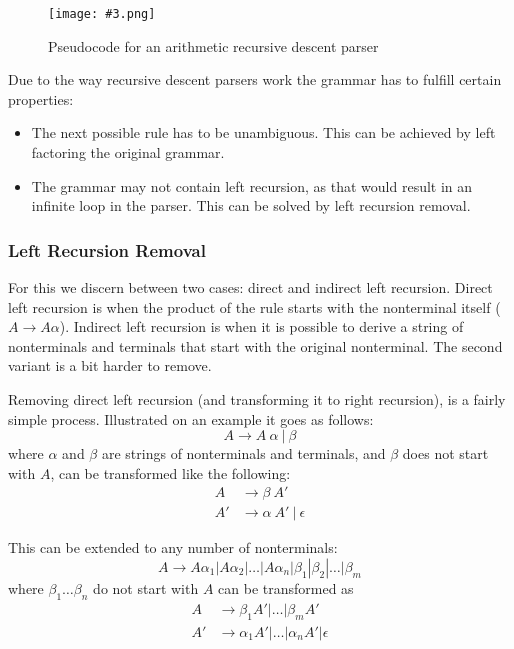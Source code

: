 \documentclass{article}
\newcommand{\fig}[4]{
	\begin{figure}[#1]
		\center
		\texttt{[image: \#3.png]}
		\caption{#4}
		\label{fig:#3}
	\end{figure}
	}
\begin{document}
\fig{h}{0.9}{rdparser}{Pseudocode for an arithmetic recursive descent parser}

Due to the way recursive descent parsers work the grammar has to fulfill certain properties:
\begin{itemize}
	\item The next possible rule has to be unambiguous.
		This can be achieved by left factoring the original grammar.
	\item The grammar may not contain left recursion, as that would result in an infinite loop in the parser.
		This can be solved by left recursion removal.
\end{itemize}

\subsubsection{Left Recursion Removal}
For this we discern between two cases: direct and indirect left recursion.
Direct left recursion is when the product of the rule starts with the nonterminal itself ($A \rightarrow A\alpha$).
Indirect left recursion is when it is possible to derive a string of nonterminals and terminals that start with the original nonterminal.
The second variant is a bit harder to remove.

Removing direct left recursion (and transforming it to right recursion), is a fairly simple process.
Illustrated on an example it goes as follows:
\begin{equation}
	A \rightarrow A\ \alpha\ |\ \beta
\end{equation}
where $\alpha$ and $\beta$ are strings of nonterminals and terminals, and $\beta$ does not start with $A$, can be transformed like the following:
\begin{align}
	A &\rightarrow \beta\ A'\\
	A' &\rightarrow \alpha\ A'\ |\ \epsilon
\end{align}

This can be extended to any number of nonterminals:
\begin{equation}
	A \rightarrow A\alpha_1 | A\alpha_2 | \dots | A\alpha_n | \beta_1 | \beta_2 | \dots | \beta_m
\end{equation}
where $\beta_1 \dots \beta_n$ do not start with $A$ can be transformed as
\begin{align}
	A &\rightarrow \beta_1A' | \dots | \beta_mA'\\
	A' &\rightarrow \alpha_1 A' | \dots | \alpha_n A' | \epsilon
\end{align}
\end{document}
